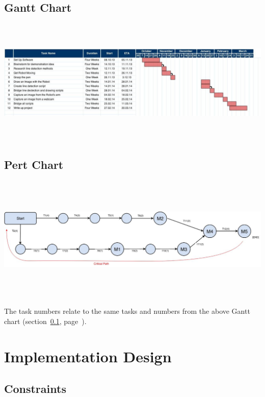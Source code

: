\documentclass{l3proj}
\begin{document}
\vspace{2mm}

\clearpage
\subsection{Gantt Chart}
\label{sec:gantt-chart}
\begin{center}
\includegraphics[width = 20cm, height = 6cm, angle=90]{TP3_Gantt}
\end{center}

\clearpage

\subsection{Pert Chart}
\label{sec:pert-chart}
\begin{center}
\includegraphics[width = 19cm, height = 6cm, angle=90]{TP3_PERT}
\end{center}
The task numbers relate to the same tasks and numbers from the above Gantt chart (section~\ref{sec:gantt-chart}, page~\pageref{sec:gantt-chart}).
\clearpage




\section{Implementation Design}
\subsection{Constraints}
\end{document}
